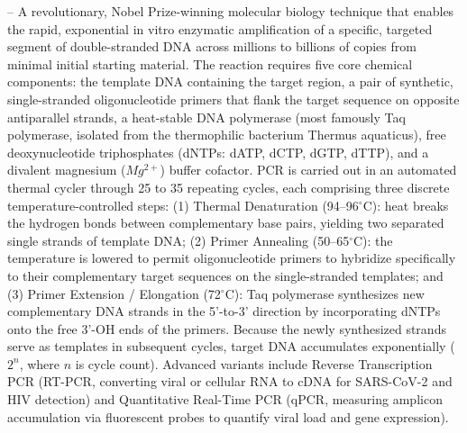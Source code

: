 -- A revolutionary, Nobel Prize-winning molecular biology technique that enables the rapid, exponential in vitro enzymatic amplification of a specific, targeted segment of double-stranded DNA across millions to billions of copies from minimal initial starting material. The reaction requires five core chemical components: the template DNA containing the target region, a pair of synthetic, single-stranded oligonucleotide primers that flank the target sequence on opposite antiparallel strands, a heat-stable DNA polymerase (most famously Taq polymerase, isolated from the thermophilic bacterium Thermus aquaticus), free deoxynucleotide triphosphates (dNTPs: dATP, dCTP, dGTP, dTTP), and a divalent magnesium ($Mg^{2+}$) buffer cofactor. PCR is carried out in an automated thermal cycler through 25 to 35 repeating cycles, each comprising three discrete temperature-controlled steps: (1) Thermal Denaturation (94--96$^\circ$C): heat breaks the hydrogen bonds between complementary base pairs, yielding two separated single strands of template DNA; (2) Primer Annealing (50--65$^\circ$C): the temperature is lowered to permit oligonucleotide primers to hybridize specifically to their complementary target sequences on the single-stranded templates; and (3) Primer Extension / Elongation (72$^\circ$C): Taq polymerase synthesizes new complementary DNA strands in the 5'-to-3' direction by incorporating dNTPs onto the free 3'-OH ends of the primers. Because the newly synthesized strands serve as templates in subsequent cycles, target DNA accumulates exponentially ($2^n$, where $n$ is cycle count). Advanced variants include Reverse Transcription PCR (RT-PCR, converting viral or cellular RNA to cDNA for SARS-CoV-2 and HIV detection) and Quantitative Real-Time PCR (qPCR, measuring amplicon accumulation via fluorescent probes to quantify viral load and gene expression).

